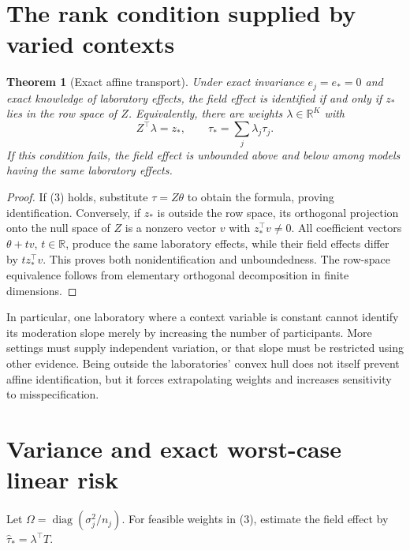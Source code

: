 \documentclass[11pt,a4paper]{article}
\newtheorem{theorem}{Theorem}[section]
\theoremstyle{remark}
\newcommand{\R}{\mathbb R}
\begin{document}
\section{The rank condition supplied by varied contexts}
\begin{theorem}[Exact affine transport]
Under exact invariance $e_j=e_*=0$ and exact knowledge of laboratory effects, the field effect is identified if and only if $z_*$ lies in the row space of $Z$. Equivalently, there are weights $\lambda\in\R^K$ with
\[
 Z^\top\lambda=z_*,\qquad
 \tau_*=\sum_j\lambda_j\tau_j. \tag{3}
\]
If this condition fails, the field effect is unbounded above and below among models having the same laboratory effects.
\end{theorem}
\begin{proof}
If (3) holds, substitute $\tau=Z\theta$ to obtain the formula, proving identification. Conversely, if $z_*$ is outside the row space, its orthogonal projection onto the null space of $Z$ is a nonzero vector $v$ with $z_*^\top v\ne0$. All coefficient vectors $\theta+tv$, $t\in\R$, produce the same laboratory effects, while their field effects differ by $t z_*^\top v$. This proves both nonidentification and unboundedness. The row-space equivalence follows from elementary orthogonal decomposition in finite dimensions.
\end{proof}
In particular, one laboratory where a context variable is constant cannot identify its moderation slope merely by increasing the number of participants. More settings must supply independent variation, or that slope must be restricted using other evidence. Being outside the laboratories' convex hull does not itself prevent affine identification, but it forces extrapolating weights and increases sensitivity to misspecification.

\section{Variance and exact worst-case linear risk}
Let $\Omega=\operatorname{diag}(\sigma_j^2/n_j)$. For feasible weights in (3), estimate the field effect by $\widehat\tau_*=\lambda^\top T$.
\end{document}

